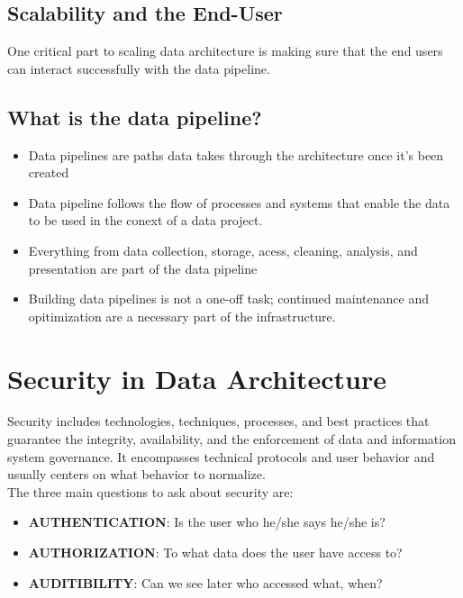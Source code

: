 \documentclass[12pt,a4paper]{article}
\begin{document}
\subsection{Scalability and the End-User}

One critical part to scaling data architecture is making sure that the end users can interact successfully with the data pipeline.

\subsection{What is the data pipeline?}

\begin{itemize}
	\item Data pipelines are paths data takes through the architecture once it's been created
	\item Data pipeline follows the flow of processes and systems that enable the data to be used in the conext of a data project.
	\item Everything from data collection, storage, acess, cleaning, analysis, and presentation are part of the data pipeline
	\item Building data pipelines is not a one-off task; continued maintenance and opitimization are a necessary part of the infrastructure.
\end{itemize}

\section{Security in Data Architecture}

Security includes technologies, techniques,
processes, and best practices that guarantee
the integrity, availability, and the enforcement
of data and information system governance.
It encompasses technical protocols and user
behavior and usually centers on what behavior
to normalize.
\\
The three main questions to ask about security are:

\begin{itemize}
	\item \textbf{AUTHENTICATION}: Is the user who he/she says he/she is?

	\item \textbf{AUTHORIZATION}: To what data does the user have access to?

	\item \textbf{AUDITIBILITY}: Can we see later who accessed what, when?
\end{itemize}
\end{document}
